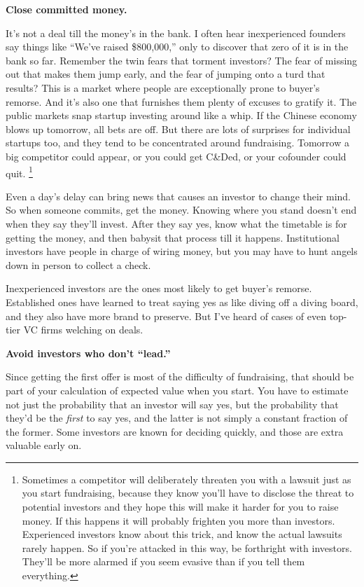 \textbf{Close committed money.}

It's not a deal till the money's in the bank. I often hear inexperienced
founders say things like ``We've raised \$800,000,'' only to discover
that zero of it is in the bank so far. Remember the twin fears that
torment investors? The fear of missing out that makes them jump early,
and the fear of jumping onto a turd that results? This is a market where
people are exceptionally prone to buyer's remorse. And it's also one
that furnishes them plenty of excuses to gratify it. The public markets
snap startup investing around like a whip. If the Chinese economy blows
up tomorrow, all bets are off. But there are lots of surprises for
individual startups too, and they tend to be concentrated around
fundraising. Tomorrow a big competitor could appear, or you could get
C\&Ded, or your cofounder could quit. \footnote{Sometimes a competitor will deliberately threaten you with a
lawsuit just as you start fundraising, because they know you'll have to
disclose the threat to potential investors and they hope this will make
it harder for you to raise money. If this happens it will probably
frighten you more than investors. Experienced investors know about this
trick, and know the actual lawsuits rarely happen. So if you're attacked
in this way, be forthright with investors. They'll be more alarmed if
you seem evasive than if you tell them everything.}

Even a day's delay can bring news that causes an investor to change
their mind. So when someone commits, get the money. Knowing where you
stand doesn't end when they say they'll invest. After they say yes, know
what the timetable is for getting the money, and then babysit that
process till it happens. Institutional investors have people in charge
of wiring money, but you may have to hunt angels down in person to
collect a check.

Inexperienced investors are the ones most likely to get buyer's remorse.
Established ones have learned to treat saying yes as like diving off a
diving board, and they also have more brand to preserve. But I've heard
of cases of even top-tier VC firms welching on deals.

\textbf{Avoid investors who don't ``lead.''}

Since getting the first offer is most of the difficulty of fundraising,
that should be part of your calculation of expected value when you
start. You have to estimate not just the probability that an investor
will say yes, but the probability that they'd be the \emph{first} to say
yes, and the latter is not simply a constant fraction of the former.
Some investors are known for deciding quickly, and those are extra
valuable early on.

